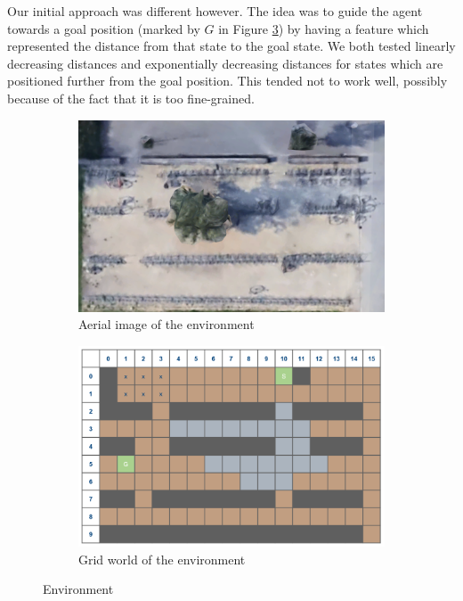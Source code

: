 \documentclass[10pt,a4paper,twocolumn]{article}
\begin{document}
Our initial approach was different however. The idea was to guide the agent towards a goal position (marked by $G$ in Figure \ref{fig:gridworld}) by having a feature which represented the distance from that state to the goal state.
We both tested linearly decreasing distances and exponentially decreasing distances for states which are positioned further from the goal position. This tended not to work well, possibly because of the fact that it is too fine-grained.

\begin{figure}[h]
\begin{subfigure}[b]{0.5\textwidth}
	\includegraphics[width=\textwidth]{google}
	\caption{Aerial image of the environment}
	\label{fig:google}
\end{subfigure}
\begin{subfigure}[b]{0.5\textwidth}
	\includegraphics[width=\textwidth]{gridworld}
	\caption{Grid world of the environment}
	\label{fig:gridworld}
\end{subfigure}
\caption{Environment}
\end{figure}
\end{document}
